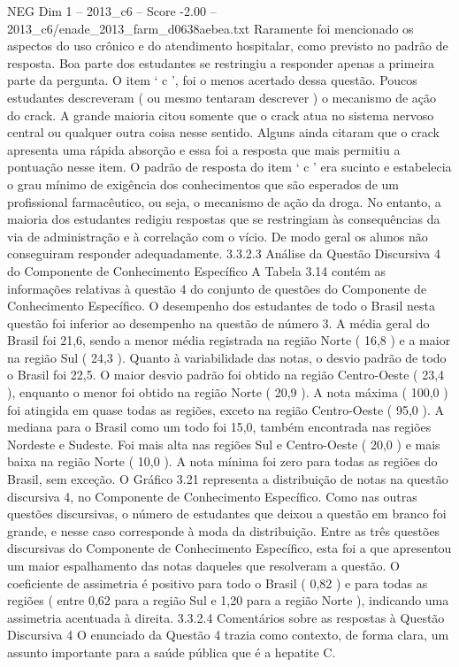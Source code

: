 \begin{textsample}{NEG Dim 1 – 2013\_c6 – Score -2.00 – 2013\_c6/enade\_2013\_farm\_d0638aebea.txt}
Raramente foi mencionado os aspectos do uso crônico e do atendimento hospitalar, como previsto no padrão de resposta.
Boa parte dos estudantes se restringiu a responder apenas a primeira parte da pergunta.
O item ‘ c ’, foi o menos acertado dessa questão.
Poucos estudantes descreveram ( ou mesmo tentaram descrever ) o mecanismo de ação do crack.
A grande maioria citou somente que o crack atua no sistema nervoso central ou qualquer outra coisa nesse sentido.
Alguns ainda citaram que o crack apresenta uma rápida absorção e essa foi a resposta que mais permitiu a pontuação nesse item.
O padrão de resposta do item ‘ c ’ era sucinto e estabelecia o grau mínimo de exigência dos conhecimentos que são esperados de um profissional farmacêutico, ou seja, o mecanismo de ação da droga.
No entanto, a maioria dos estudantes redigiu respostas que se restringiam às consequências da via de administração e à correlação com o vício.
De modo geral os alunos não conseguiram responder adequadamente. 3.3.2.3 Análise da Questão Discursiva 4 do Componente de Conhecimento Específico A Tabela 3.14 contém as informações relativas à questão 4 do conjunto de questões do Componente de Conhecimento Específico.
O desempenho dos estudantes de todo o Brasil nesta questão foi inferior ao desempenho na questão de número 3.
A média geral do Brasil foi 21,6, sendo a menor média registrada na região Norte ( 16,8 ) e a maior na região Sul ( 24,3 ).
Quanto à variabilidade das notas, o desvio padrão de todo o Brasil foi 22,5.
O maior desvio padrão foi obtido na região Centro-Oeste ( 23,4 ), enquanto o menor foi obtido na região Norte ( 20,9 ).
A nota máxima ( 100,0 ) foi atingida em quase todas as regiões, exceto na região Centro-Oeste ( 95,0 ).
A mediana para o Brasil como um todo foi 15,0, também encontrada nas regiões Nordeste e Sudeste.
Foi mais alta nas regiões Sul e Centro-Oeste ( 20,0 ) e mais baixa na região Norte ( 10,0 ).
A nota mínima foi zero para todas as regiões do Brasil, sem exceção.
O Gráfico 3.21 representa a distribuição de notas na questão discursiva 4, no Componente de Conhecimento Específico.
Como nas outras questões discursivas, o número de estudantes que deixou a questão em branco foi grande, e nesse caso corresponde à moda da distribuição.
Entre as três questões discursivas do Componente de Conhecimento Específico, esta foi a que apresentou um maior espalhamento das notas daqueles que resolveram a questão.
O coeficiente de assimetria é positivo para todo o Brasil ( 0,82 ) e para todas as regiões ( entre 0,62 para a região Sul e 1,20 para a região Norte ), indicando uma assimetria acentuada à direita. 3.3.2.4 Comentários sobre as respostas à Questão Discursiva 4 O enunciado da Questão 4 trazia como contexto, de forma clara, um assunto importante para a saúde pública que é a hepatite C.

\end{textsample}
